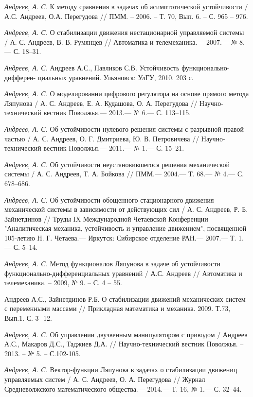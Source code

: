 \begin{thebibliography}{10}
	{\it Андреев, А. С.} К методу сравнения в задачах об асимптотической устойчивости / А.С. Андреев, О.А. Перегудова // ПММ. – 2006. – Т. 70, Вып. 6. – С. 965 – 976.
	
	{\it Андреев, А. С.} О стабилизации движения нестационарной управляемой системы /
	А. С. Андреев, В. В. Румянцев // Автоматика и телемеханика.— 2007.— № 8.—
	С. 18–31.
	
	{\it Андреев, А. С.} Андреев А.С., Павликов С.В. Устойчивость функционально-дифферен-
	циальных уравнений. Ульяновск: УлГУ, 2010. 203 с.
	
	{\it Андреев, А. С.} О моделировании цифрового регулятора на основе прямого метода Ляпунова /
	А. С. Андреев, Е. А. Кудашова, О. А. Перегудова // Научно-технический вестник Поволжья.— 2013.— № 6.—
	С. 113–115.
	
	{\it Андреев, А. С.} Об устойчивости нулевого решения системы с разрывной правой частью /
	А. С. Андреев, О. Г. Дмитриева, Ю. В. Петровичева // Научно-технический вестник Поволжья.— 2011.— № 1.—
	С. 15–21.
	
	{\it Андреев, А. С.} Об устойчивости неустановившегося решения механической системы /
	А. С. Андреев, Т. А. Бойкова // ПММ.— 2004.— Т. 68.— № 4.— С. 678–686.
	
	{\it Андреев, А. С.} Об устойчивости обощенного стационарного движения механической системы в зависимости от действующих сил /
	А. С. Андреев, Р. Б. Зайнетдинов // Труды IX Международной Четаевской Конференции "Аналитическая механика, устойчивость и управление движением", посвященной 105-летию Н. Г. Четаева.— Иркутск: Сибирское отделение РАН.— 2007.— Т. 1.— С. 5–14.
	
	{\it Андреев, А. С.} Метод функционалов Ляпунова в задаче об устойчивости функционально-дифференциальных уравнений / А.С. Андреев // Автоматика и телемеханика. – 2009, № 9. – С. 4 – 55.
	
	Андреев А.С., Зайнетдинов Р.Б. О стабилизации движений механических систем с
	переменными массами // Прикладная математика и механика. 2009. Т.73, Вып.1. С. 3 -12.
	
	{\it Андреев, А. С.} Об управлении двузвенным манипулятором с приводом / Андреев А.С., Макаров Д.С., Таджиев Д.А. // Научно-технический вестник Поволжья. – 2013. – № 5. – С.102-105.
	
	{\it Андреев, А. С.} Вектор-функции Ляпунова в задачах о стабилизации движениц управляемых систем /
	А. С. Андреев, О. А. Перегудова // Журнал Средневолжского математического общества.— 2014.— Т. 16, № 1.—
	С. 32–44.
	

\end{thebibliography}
